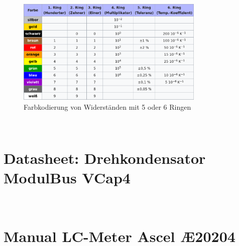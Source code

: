     \begin{figure}[h]
        \centering
        \includegraphics[width=0.8\textwidth]{appendix/formulary/R-Farbcode.png}
        \caption{Farbkodierung von Widerständen mit 5 oder 6 Ringen \cite{wpwiderstand}}
        \label{fig:r-farbcode}
    \end{figure}

\clearpage\newpage ~


\chapter{Datasheet: Drehkondensator ModulBus VCap4}
    \label{att:vcap}

    

\clearpage\newpage ~


\chapter{Manual LC-Meter Ascel Æ20204}
    \label{att:ae20204}

    

\clearpage\newpage ~

